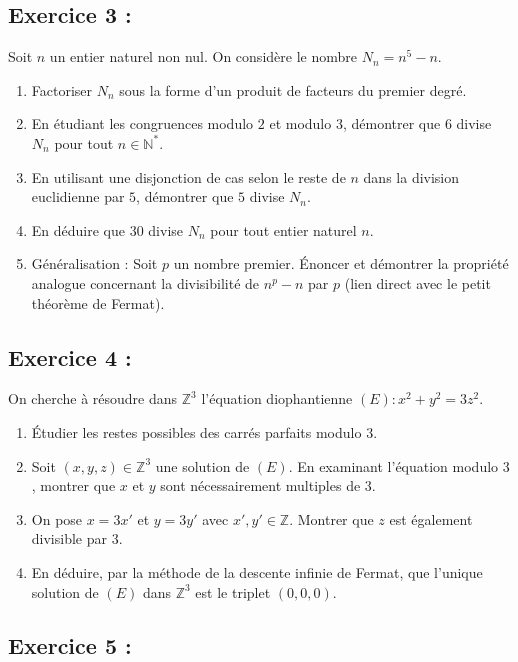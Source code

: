 \documentclass[12pt,a4paper]{article}
\begin{document}
\subsection*{Exercice 3 :}

Soit $n$ un entier naturel non nul. On considère le nombre $N_n = n^5 - n$.
\begin{enumerate}
    \item Factoriser $N_n$ sous la forme d'un produit de facteurs du premier degré.
    \item En étudiant les congruences modulo $2$ et modulo $3$, démontrer que $6$ divise $N_n$ pour tout $n \in \mathbb{N}^*$.
    \item En utilisant une disjonction de cas selon le reste de $n$ dans la division euclidienne par $5$, démontrer que $5$ divise $N_n$.
    \item En déduire que $30$ divise $N_n$ pour tout entier naturel $n$.
    \item Généralisation : Soit $p$ un nombre premier. Énoncer et démontrer la propriété analogue concernant la divisibilité de $n^p - n$ par $p$ (lien direct avec le petit théorème de Fermat).
\end{enumerate}


\subsection*{Exercice 4 :}

On cherche à résoudre dans $\mathbb{Z}^3$ l'équation diophantienne $(E) : x^2 + y^2 = 3z^2$.
\begin{enumerate}
    \item Étudier les restes possibles des carrés parfaits modulo $3$.
    \item Soit $(x, y, z) \in \mathbb{Z}^3$ une solution de $(E)$. En examinant l'équation modulo $3$, montrer que $x$ et $y$ sont nécessairement multiples de $3$.
    \item On pose $x = 3x'$ et $y = 3y'$ avec $x', y' \in \mathbb{Z}$. Montrer que $z$ est également divisible par $3$.
    \item En déduire, par la méthode de la descente infinie de Fermat, que l'unique solution de $(E)$ dans $\mathbb{Z}^3$ est le triplet $(0, 0, 0)$.
\end{enumerate}



\subsection*{Exercice 5 :}
\end{document}
